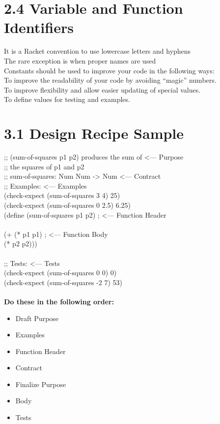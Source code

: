 \documentclass{article}     %
\begin{document}
\section*{2.4 Variable and Function Identifiers}
It is a Racket convention to use lowercase letters and hyphens\\
The rare exception is when proper names are used\\
Constants should be used to improve your code in the following ways:\\
\indent To improve the readability of your code by avoiding “magic” numbers.\\
\indent To improve flexibility and allow easier updating of special values.\\
\indent To define values for testing and examples.

\section*{3.1 Design Recipe Sample}
;; (sum-of-squares p1 p2) produces the sum of \hfill <--- Purpose\\
;; \indent the squares of p1 and p2\\
;; sum-of-squares: Num Num -> Num \hfill <--- Contract\\
;; Examples: \hfill <--- Examples\\
(check-expect (sum-of-squares 3 4) 25)\\
(check-expect (sum-of-squares 0 2.5) 6.25)\\
(define (sum-of-squares p1 p2) ; \hfill <--- Function Header\\
\\
(+ (* p1 p1) ; \hfill <--- Function Body\\
\indent (* p2 p2)))\\
\\
;; Tests: \hfill <--- Tests\\
(check-expect (sum-of-squares 0 0) 0)\\
(check-expect (sum-of-squares -2 7) 53)\\\\
\textbf{Do these in the following order:}
\begin{itemize}
    \item Draft Purpose
    \item Examples
    \item Function Header
    \item Contract
    \item Finalize Purpose
    \item Body
    \item Tests
\end{itemize}
\end{document}
